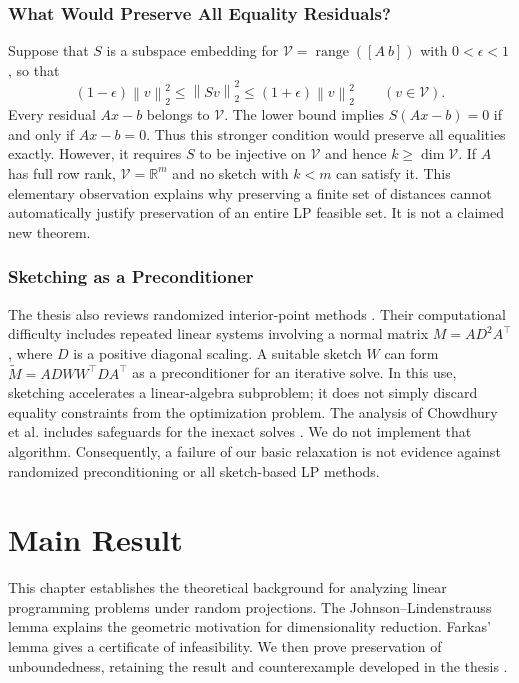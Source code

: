 \documentclass[12pt,letterpaper,oneside]{report}
\theoremstyle{definition}
\newcommand{\R}{\mathbb{R}}
\newcommand{\norm}[1]{\left\lVert #1\right\rVert}
\begin{document}
\subsection{What Would Preserve All Equality Residuals?}
Suppose that $S$ is a subspace embedding for
$\mathcal{V}=\operatorname{range}([A\ b])$ with $0<\epsilon<1$, so that
\[
(1-\epsilon)\norm{v}_2^2\leq\norm{Sv}_2^2
\leq(1+\epsilon)\norm{v}_2^2\qquad(v\in\mathcal{V}).
\]
Every residual $Ax-b$ belongs to $\mathcal{V}$. The lower bound implies
$S(Ax-b)=0$ if and only if $Ax-b=0$. Thus this stronger condition would
preserve all equalities exactly. However, it requires $S$ to be injective
on $\mathcal{V}$ and hence $k\geq\dim\mathcal{V}$. If $A$ has full row
rank, $\mathcal{V}=\R^m$ and no sketch with $k<m$ can satisfy it.
This elementary observation explains why preserving a finite set of
distances cannot automatically justify preservation of an entire LP
feasible set. It is not a claimed new theorem.

\subsection{Sketching as a Preconditioner}
The thesis also reviews randomized interior-point methods
\cite[pp.~31--35]{thesis2025}. Their computational difficulty includes
repeated linear systems involving a normal matrix
$M=AD^2A^\top$, where $D$ is a positive diagonal scaling.
A suitable sketch $W$ can form
$\widetilde M=ADWW^\top DA^\top$ as a preconditioner for an iterative
solve. In this use, sketching accelerates a linear-algebra subproblem;
it does not simply discard equality constraints from the optimization
problem. The analysis of Chowdhury et al. includes safeguards for the
inexact solves \cite{chowdhury2022}. We do not implement that algorithm.
Consequently, a failure of our basic relaxation is not evidence against
randomized preconditioning or all sketch-based LP methods.

\chapter{Main Result}
This chapter establishes the theoretical background for analyzing linear
programming problems under random projections. The
Johnson--Lindenstrauss lemma explains the geometric motivation for
dimensionality reduction. Farkas' lemma gives a certificate of
infeasibility. We then prove preservation of unboundedness, retaining the
result and counterexample developed in the thesis \cite{thesis2025}.
\end{document}
